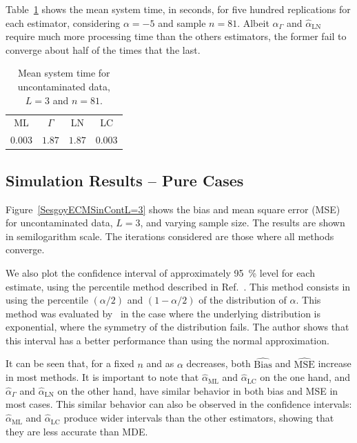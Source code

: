 \documentclass[twocolumn]{svjour3}
\begin{document}
Table~\ref{tablaDeTiemposmediosMLyGAyLNyLC} shows the mean system time, in seconds, for five hundred replications for each estimator, considering $\alpha=-5$ and sample $n=81$. 
Albeit $\widehat{\alpha}_{\Gamma}$ and $\widehat{\alpha}_{\text{{LN}}}$ require much more processing time than the others estimators, the former fail to converge about half of the times that the last.

\begin{table}[hbt]
	\caption{Mean system time for uncontaminated data, $L=3$ and $n=81$. }
	\label{tablaDeTiemposmediosMLyGAyLNyLC}
	\centering
	\begin{tabular}{cccc}
		\toprule
		ML& $\Gamma$ & LN & LC \\
		\cmidrule(lr){1-4}
		$0.003$& $1.87$ & $1.87$ &$0.003$ \\
		\bottomrule
	\end{tabular}
	
\end{table}

\subsection{Simulation Results -- Pure Cases}

Figure~\ref{SesgoyECMSinContL=3} shows the bias and mean square error (MSE) for uncontaminated data, $L=3$, and varying sample size. 
The results are shown in semilogarithm scale. 
The iterations considered are those where all methods converge. 

We also plot the confidence interval of approximately \SI{95}{\percent} level for each estimate, using the percentile method described in Ref.~\cite{Buckland1983}. 
This method consists in using the percentile $(\alpha/2)$ and $(1-\alpha/2) $ of the distribution of $\widehat{\alpha}$. 
This method was evaluated by~\cite{Buckland1983} in the case where the underlying distribution is exponential, where the symmetry of the distribution fails. 
The author shows that this interval has a better performance than using the normal approximation. 

It can be seen that, for a fixed $n$ and as $\alpha$ decreases, both  $\widehat{\text{Bias}}$ and $\widehat{\text{MSE}}$ increase in most methods. 
It is important to note that $\widehat{\alpha}_{\text{{ML}}}$ and $\widehat{\alpha}_{\text{{LC}}}$ on the one hand, 
and $\widehat{\alpha}_{\Gamma}$ and $\widehat{\alpha}_{\text{{LN}}}$ on the other hand, have similar behavior in both bias and MSE in most cases. 
This similar behavior can also be observed in the confidence intervals: $\widehat{\alpha}_{\text{{ML}}}$ and $\widehat{\alpha}_{\text{{LC}}}$ produce wider intervals than the other estimators, showing that they are less accurate than MDE.
\end{document}
